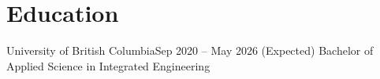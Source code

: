 \section{Education}
	\resumeSubHeadingListStart
	\resumeSubheading
	{University of British Columbia}{Sep 2020 – May 2026 (Expected)}
	{Bachelor of Applied Science in Integrated Engineering}{}
	\resumeSubHeadingListEnd